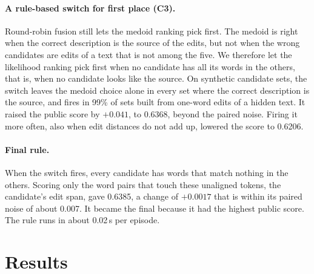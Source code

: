 \documentclass[10pt,twocolumn]{article}
\newcommand{\cha}[1]{\textsf{C#1}}
\begin{document}
\paragraph{A rule-based switch for first place (\cha3).} Round-robin fusion still lets the medoid ranking pick
first. The medoid is right when the correct description is the source of the edits, but not when the wrong
candidates are edits of a text that is not among the five. We therefore let the likelihood ranking pick first
when no candidate has all its words in the others, that is, when no candidate looks like the source. On synthetic
candidate sets, the switch leaves the medoid choice alone in every set where the correct description is the source,
and fires in 99\% of sets built from one-word edits of a hidden text. It raised the public score by $+0.041$, to
0.6368, beyond the paired noise. Firing it more often, also when edit distances do not add up, lowered the score
to 0.6206.

\paragraph{Final rule.} When the switch fires, every candidate has words that match nothing in the others. Scoring
only the word pairs that touch these unaligned tokens, the candidate's edit span, gave 0.6385, a change of
$+0.0017$ that is within its paired noise of about 0.007. It became the final because it had the highest public
score. The rule runs in about 0.02\,s per episode.

\section{Results}
\end{document}

